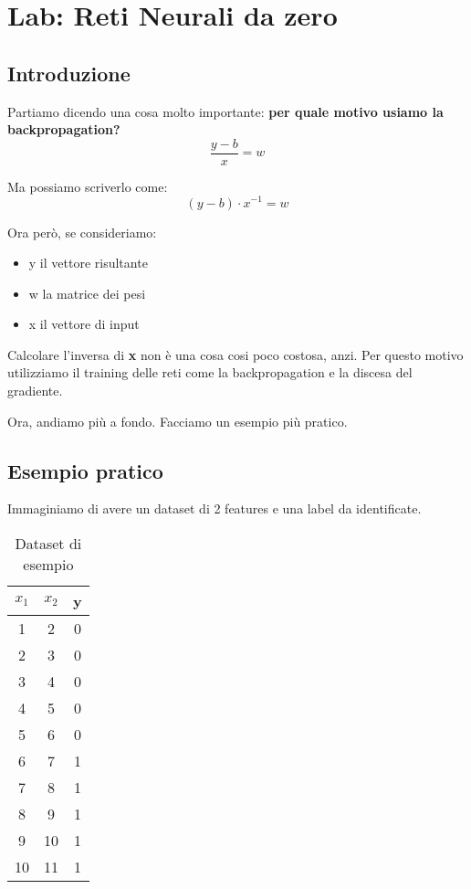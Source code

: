 \section{Lab: Reti Neurali da zero}
\subsection{Introduzione}

Partiamo dicendo una cosa molto importante: \textbf{per quale motivo usiamo la
    backpropagation?}
\begin{equation}
    \frac{y-b}{x} = w
\end{equation}

Ma possiamo scriverlo come:
\begin{equation}
    (y-b) \cdot x^{-1} = w
\end{equation}

Ora però, se consideriamo:
\begin{itemize}
    \item y il vettore risultante
    \item w la matrice dei pesi
    \item x il vettore di input
\end{itemize}

Calcolare l'inversa di \textbf{x} non è una cosa cosi poco costosa, anzi. Per
questo motivo utilizziamo il training delle reti come la backpropagation e la
discesa del gradiente.

Ora, andiamo più a fondo. Facciamo un esempio più pratico.

\subsection{Esempio pratico}

Immaginiamo di avere un dataset di 2 features e una label da identificate.
\begin{table}[h!]
    \centering
    \begin{tabular}{|c|c|c|}
        \hline
        $x_1$ & $x_2$ & y \\
        \hline
        1     & 2     & 0 \\
        2     & 3     & 0 \\
        3     & 4     & 0 \\
        4     & 5     & 0 \\
        5     & 6     & 0 \\
        6     & 7     & 1 \\
        7     & 8     & 1 \\
        8     & 9     & 1 \\
        9     & 10    & 1 \\
        10    & 11    & 1 \\
        \hline
    \end{tabular}
    \caption{Dataset di esempio}
    \label{tab:my_label}
\end{table}

